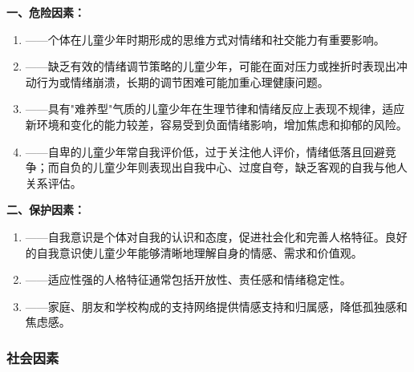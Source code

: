 \begin{defbox}
\textbf{一、危险因素：}

\begin{enumerate}[leftmargin=*]
    \item {}——个体在儿童少年时期形成的思维方式对情绪和社交能力有重要影响。
    \item {}——缺乏有效的情绪调节策略的儿童少年，可能在面对压力或挫折时表现出冲动行为或情绪崩溃，长期的调节困难可能加重心理健康问题。
    \item {}——具有"难养型"气质的儿童少年在生理节律和情绪反应上表现不规律，适应新环境和变化的能力较差，容易受到负面情绪影响，增加焦虑和抑郁的风险。
    \item {}——自卑的儿童少年常自我评价低，过于关注他人评价，情绪低落且回避竞争；而自负的儿童少年则表现出自我中心、过度自夸，缺乏客观的自我与他人关系评估。
\end{enumerate}

\textbf{二、保护因素：}

\begin{enumerate}[leftmargin=*]
    \item {}——自我意识是个体对自我的认识和态度，促进社会化和完善人格特征。良好的自我意识使儿童少年能够清晰地理解自身的情感、需求和价值观。
    \item {}——适应性强的人格特征通常包括开放性、责任感和情绪稳定性。
    \item {}——家庭、朋友和学校构成的支持网络提供情感支持和归属感，降低孤独感和焦虑感。
\end{enumerate}
\end{defbox}

\subsubsection{社会因素}

